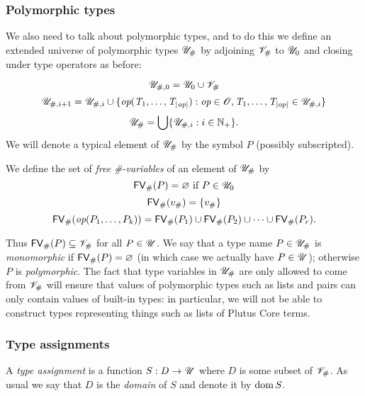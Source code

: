 
\subsubsection{Polymorphic types}
\label{sec:polymorphic-types}
We also need to talk about polymorphic types, and to do this we define an
extended universe of polymorphic types ${\mathscr{U}_{\#}}$ by adjoining $\mathscr{V}_\#$ to
$\mathscr{U}_0$ and closing under type operators as before:

$$
\mathscr{U}_{\#,0} = \mathscr{U}_0 \cup \mathscr{V}_\#
$$
$$
\mathscr{U}_{\#,i+1} = \mathscr{U}_{\#,i} \cup \{\textit{op}(\textit{T}_1, \ldots, \textit{T}_{\left| \textit{op} \right|}): \textit{op} \in \mathscr{O}, \textit{T}_1, \ldots, \textit{T}_{\left| op \right|} \in \mathscr{U}_{\#,i}\}
$$
$$
{\mathscr{U}_{\#}} = \bigcup\{\mathscr{U}_{\#,i}: i \in \mathbb{N}_{+}\}.$$%
%
\noindent We will denote a typical element of ${\mathscr{U}_{\#}}$ by the symbol $P$
(possibly subscripted).%

\noindent We define the set of \textit{free \#-variables} of an element of ${\mathscr{U}_{\#}}$ by
$$
\mathsf{FV}_{\#}(P) = \varnothing \ \text{if $P \in \mathscr{U}_0$}
$$
$$
\mathsf{FV}_{\#}(v_\#) = \{v_\#\}
$$
$$
\mathsf{FV}_{\#}(\textit{op}(P_1, \ldots, P_k)) = \mathsf{FV}_{\#}(P_1) \cup \mathsf{FV}_{\#}(P_2) \cup \cdots \cup \mathsf{FV}_{\#}(P_r).
$$%

\noindent Thus $\mathsf{FV}_{\#}(P) \subseteq \mathscr{V}_\#$ for all $P \in \mathscr{U}$.  We say that a
type name $P \in {\mathscr{U}_{\#}}$ is \textit{monomorphic} if $\mathsf{FV}_{\#}(P) = \varnothing$ (in
which case we actually have $P \in \mathscr{U}$); otherwise $P$ is
\textit{polymorphic}.  The fact that type variables in ${\mathscr{U}_{\#}}$ are only
allowed to come from $\mathscr{V}_\#$ will ensure that values of polymorphic types such
as lists and pairs can only contain values of built-in types: in particular, we
will not be able to construct types representing things such as lists of Plutus
Core terms.


\subsubsection{Type assignments}
\label{sec:type-assignments}
A \textit{type assignment} is a function $S: D \rightarrow \mathscr{U}$ where $D$ is
some subset of $\mathscr{V}_\#$.  As usual we say that $D$ is the \textit{domain} of
$S$ and denote it by $\operatorname{dom} S$.%


